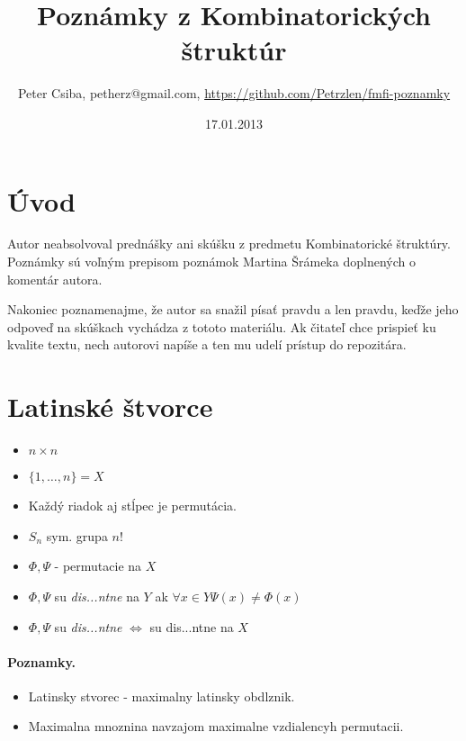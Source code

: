 \documentclass[10pt,a4paper]{article}
\title{Poznámky z Kombinatorických štruktúr}
\date{17.01.2013}
\author{Peter Csiba, petherz@gmail.com, \url{https://github.com/Petrzlen/fmfi-poznamky}}
\begin{document}
\maketitle
\tableofcontents

\clearpage

\section{Úvod}

Autor neabsolvoval prednášky ani skúšku z predmetu Kombinatorické štruktúry.
Poznámky sú voľným prepisom poznámok Martina Šrámeka doplnených o komentár autora. 

Nakoniec poznamenajme, že autor sa snažil písať pravdu a len pravdu, keďže jeho odpoveď na skúškach vychádza z tototo materiálu.
Ak čitateľ chce prispieť ku kvalite textu, nech autorovi napíše a ten mu udelí prístup do repozitára. 

\section{Latinské štvorce}
\begin{itemize}
\item $n \times n$
\item $\{1,\ldots,n\} = X$
\item Každý riadok aj stĺpec je permutácia. 
\end{itemize}


\begin{itemize}
\item $S_n$ sym. grupa $n!$
\item $\Phi, \Psi$ - permutacie na $X$
\item $\Phi, \Psi$ su \emph{dis...ntne} na $Y$ ak $\forall x \in Y \Psi(x) \neq \Phi(x)$
\item $\Phi, \Psi$ su \emph{dis...ntne} $\Leftrightarrow$ su dis...ntne na $X$
\end{itemize}

\paragraph{Poznamky.}
\begin{itemize}
\item Latinsky stvorec - maximalny latinsky obdlznik.
\item Maximalna mnoznina navzajom maximalne vzdialencyh permutacii. 
\end{itemize}
\end{document}
